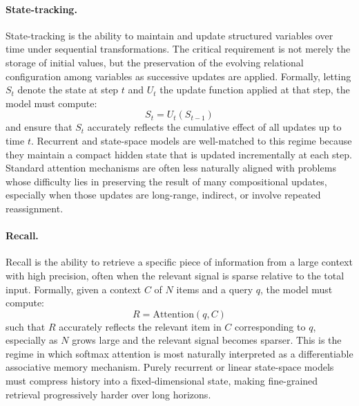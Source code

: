 \documentclass[11pt]{article}
\theoremstyle{definition}
\begin{document}
\paragraph{State-tracking.} State-tracking is the ability to maintain and update structured variables over time under sequential transformations. The critical requirement is not merely the storage of initial values, but the preservation of the evolving relational configuration among variables as successive updates are applied. Formally, letting $S_t$ denote the state at step $t$ and $U_t$ the update function applied at that step, the model must compute:
\begin{equation}
    S_t = U_t(S_{t-1})
    \label{eq:state-tracking}
\end{equation}
and ensure that $S_t$ accurately reflects the cumulative effect of all updates up to time $t$. Recurrent and state-space models are well-matched to this regime because they maintain a compact hidden state that is updated incrementally at each step. Standard attention mechanisms are often less naturally aligned with problems whose difficulty lies in preserving the result of many compositional updates, especially when those updates are long-range, indirect, or involve repeated reassignment.

\paragraph{Recall.} Recall is the ability to retrieve a specific piece of information from a large context with high precision, often when the relevant signal is sparse relative to the total input. Formally, given a context $C$ of $N$ items and a query $q$, the model must compute:
\begin{equation}
    R = \mathrm{Attention}(q, C)
    \label{eq:recall}
\end{equation}
such that $R$ accurately reflects the relevant item in $C$ corresponding to $q$, especially as $N$ grows large and the relevant signal becomes sparser. This is the regime in which softmax attention is most naturally interpreted as a differentiable associative memory mechanism. Purely recurrent or linear state-space models must compress history into a fixed-dimensional state, making fine-grained retrieval progressively harder over long horizons.
\end{document}
